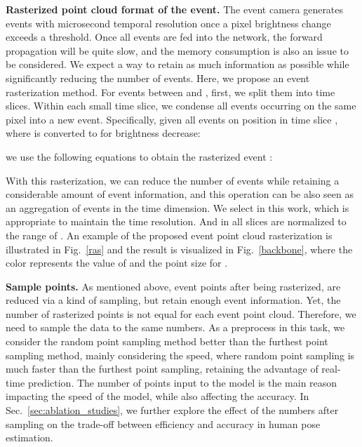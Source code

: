 \documentclass[10pt,twocolumn,letterpaper]{article}
\begin{document}
\noindent\textbf{Rasterized point cloud format of the event.}
The event camera generates events with microsecond temporal resolution once a pixel brightness change exceeds a threshold.
Once all events are fed into the network, the forward propagation will be quite slow, and the memory consumption is also an issue to be considered.
We expect a way to retain as much information as possible while significantly reducing the number of events.
Here, we propose an event rasterization method. For events between  and , first, we split them into  time slices.
Within each small time slice, we condense all events occurring on the same pixel into a new event.
Specifically, given all  events on position  in time slice , where  is converted to  for brightness decrease: 

we use the following equations to obtain the rasterized event :


With this rasterization, we can reduce the number of events while retaining a considerable amount of event information, and this operation can be also seen as an aggregation of events in the time dimension.
We select  in this work, which is appropriate to maintain the time resolution. And  in all  slices are normalized to the range of . An example of the proposed event point cloud rasterization is illustrated in Fig.~\ref{ras} and the result is visualized in Fig.~\ref{backbone}, where the color represents the value of  and the point size for .

\noindent\textbf{Sample points.}
As mentioned above, event points after being rasterized, are reduced via a kind of sampling, but retain enough event information.
Yet, the number of rasterized points is not equal for each event point cloud.
Therefore, we need to sample the data to the same numbers.
As a preprocess in this task, we consider the random point sampling method better than the furthest point sampling method, mainly considering the speed, where random point sampling is much faster than the furthest point sampling, retaining the advantage of real-time prediction.
The number of points input to the model is the main reason impacting the speed of the model, while also affecting the accuracy.
In Sec.~\ref{sec:ablation_studies}, we further explore the effect of the numbers after sampling on the trade-off between efficiency and accuracy in human pose estimation.
\end{document}

